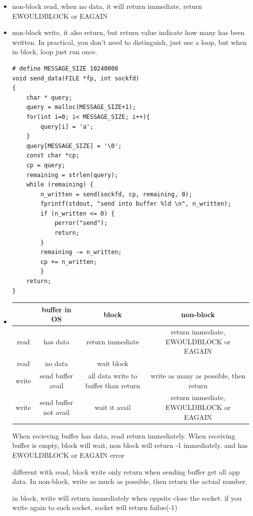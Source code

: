 \documentclass[a4paper,11pt,twoside]{book}
\begin{document}
\begin{itemize}
\item non-block read, when no data, it will return immediate, return  EWOULDBLOCK or EAGAIN

\item non-block write, it also return, but return value indicate how many has been written. In practical, you don't need to distinguish, just use a loop, but when in block, loop just run once.

\begin{lstlisting}[numbers=none]
# define MESSAGE_SIZE 10240000
void send_data(FILE *fp, int sockfd)
{
	char * query;
	query = malloc(MESSAGE_SIZE+1);
	for(int i=0; i< MESSAGE_SIZE; i++){
		query[i] = 'a';
	}
	query[MESSAGE_SIZE] = '\0';
	const char *cp;
	cp = query;
	remaining = strlen(query);
	while (remaining) {
		n_written = send(sockfd, cp, remaining, 0);
		fprintf(stdout, "send into buffer %ld \n", n_written);
		if (n_written <= 0) {
			perror("send");
			return;
		}
		remaining -= n_written;
		cp += n_written;
		}
	return;
}
\end{lstlisting}

\item 
\begin{tabular}{|c|c|c|c|}
	\hline
	& buffer in OS & block  & non-block  \\
	\hline
read	&  has data & return immediate & return immediate, EWOULDBLOCK or EAGAIN  \\
	\hline
read	& no data & wait block &  \\
	\hline
write	& send buffer avail & all data write to buffer than return & write as many as possible, then return  \\
	\hline
write	& send buffer not avail  & wait it avail & return immediate, EWOULDBLOCK or EAGAIN \\
	\hline
\end{tabular}

When recieving buffer has data, read return immediately. When receiving buffer is empty, block will wait, non block will return -1 immediately. and has EWOULDBLOCK or  EAGAIN error


different with read, block write only return when sending buffer get all app data. In non-block, write as much as possible, then return the actual number. 


in block, write will return immediately when oppsite close the socket.  if you write again to such socket, socket will return failue(-1)


\end{itemize}
\end{document}
